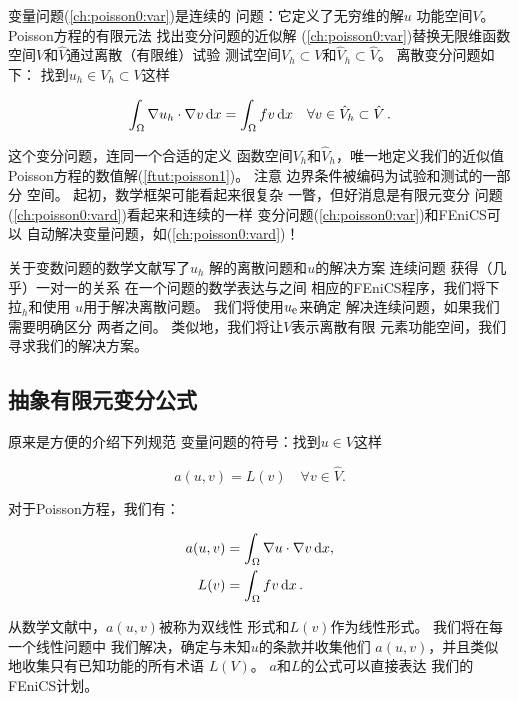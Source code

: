 变量问题(\ref{ch:poisson0:var})是连续的
问题：它定义了无穷维的解$u$
功能空间$V$。 Poisson方程的有限元法
找出变分问题的近似解
(\ref{ch:poisson0:var})替换无限维函数
空间$V$和$\hat{V}$通过离散（有限维）试验
测试空间$V_h\subset{V}$和$\hat{V}_h\subset\hat{V}$。 离散变分问题如下：
找到$u_h \in V_h \subset V$这样

\begin{equation} \label{ch:poisson0:vard}
  \int_{\Omega} \nabla u_h \cdot \nabla v \dx =
  \int_{\Omega} fv \dx
  \quad \forall v \in \hat{V}_h \subset \hat{V}\tp
\end{equation}

这个变分问题，连同一个合适的定义
函数空间$V_h$和$\hat{V}_h$，唯一地定义我们的近似值
Poisson方程的数值解(\ref{ftut:poisson1})。 注意
边界条件被编码为试验和测试的一部分
空间。 起初，数学框架可能看起来很复杂
一瞥，但好消息是有限元变分
问题(\ref{ch:poisson0:vard})看起来和连续的一样
变分问题(\ref{ch:poisson0:var})和FEniCS可以
自动解决变量问题，如(\ref{ch:poisson0:vard})！

\begin{notice}[我们的意思是符号$u$和$V$]
关于变数问题的数学文献写了$u_h$
解的离散问题和$u$的解决方案
连续问题 获得（几乎）一对一的关系
在一个问题的数学表达与之间
相应的FEniCS程序，我们将下拉$_h$和使用
$u$用于解决离散问题。
我们将使用$\uex$来确定
解决连续问题，如果我们需要明确区分
两者之间。 类似地，我们将让$V$表示离散有限
元素功能空间，我们寻求我们的解决方案。
\end{notice}

\subsection{抽象有限元变分公式}
\label{ch:poisson0:abstrat}

原来是方便的介绍下列规范
变量问题的符号：找到$u \in V$这样

\begin{equation}
a(u, v) = L(v) \quad \forall v \in \hat{V}.
\end{equation}

对于Poisson方程，我们有：

\begin{align}
a(u, v) &= \int_{\Omega} \nabla u \cdot \nabla v \dx,
\label{ch:poisson0:vard:a}\\
L(v) &= \int_{\Omega} fv \dx\tp  \label{ch:poisson0:vard:L}
\end{align}

从数学文献中，$a(u,v)$被称为双线性
形式和$L(v)$作为线性形式。 我们将在每一个线性问题中
我们解决，确定与未知$u$的条款并收集他们
$a(u,v)$，并且类似地收集只有已知功能的所有术语
$L(V)$。 $a$和$L$的公式可以直接表达
我们的FEniCS计划。

